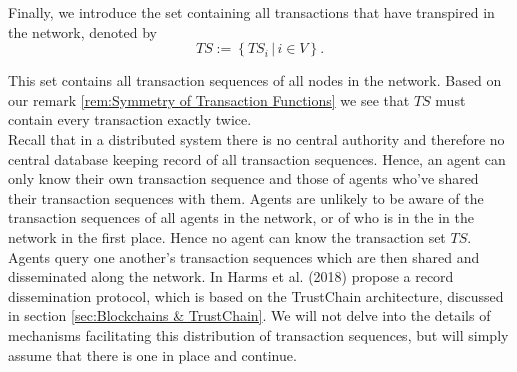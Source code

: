 \noindent{}Finally, we introduce the set containing all transactions that have transpired in the network, denoted by 
\[
TS:=\left\lbrace{}TS_i\,|\,i\in{}V\right\rbrace .
\]

\noindent{}This set contains all transaction sequences of all nodes in the network. Based on our remark \ref{rem:Symmetry of Transaction Functions} we see that $TS$ must contain every transaction exactly twice.\vspace{1em}\\

\noindent{}Recall that in a distributed system there is no central authority and therefore no central database keeping record of all transaction sequences. Hence, an agent can only know their own transaction sequence and those of agents who've shared their transaction sequences with them. Agents are unlikely to be aware of the transaction sequences of all agents in the network, or of who is in the in the network in the first place. Hence no agent can know the transaction set $TS$. \vspace{1em}\\

\noindent{}Agents query one another's transaction sequences which are then shared and disseminated along the network. In \cite{Creating Trust through Verification of Interaction Records} Harms et al. (2018) propose a record dissemination protocol, which is based on the TrustChain architecture, discussed in section \ref{sec:Blockchains & TrustChain}. We will not delve into the details of mechanisms facilitating this distribution of transaction sequences, but will simply assume that there is one in place and continue. \vspace{1em}\\

